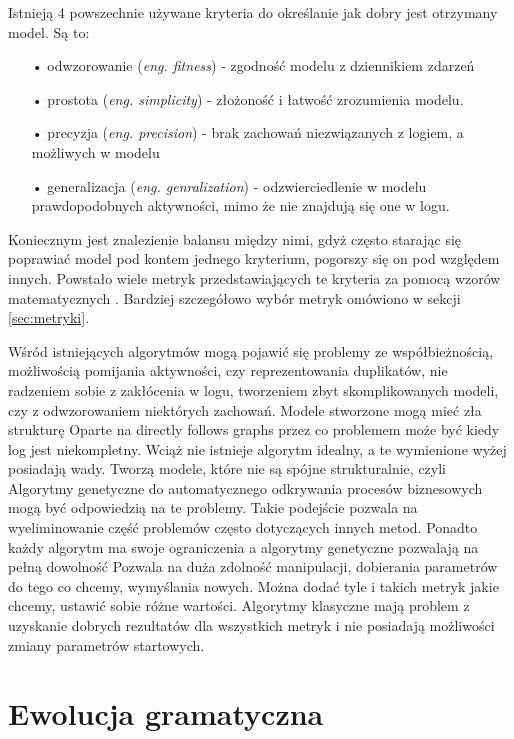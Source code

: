 Istnieją 4 powszechnie używane kryteria do określanie jak dobry jest otrzymany model. Są to:
\begin{itemize}
  \item[•] odwzorowanie (\textit{eng. fitness}) - zgodność modelu z dziennikiem zdarzeń
  \item[•] prostota (\textit{eng. simplicity}) - złożoność i łatwość zrozumienia modelu.
  \item[•] precyzja (\textit{eng. precision}) - brak zachowań niezwiązanych z logiem, a możliwych w modelu
  \item[•] generalizacja (\textit{eng. genralization}) - odzwierciedlenie w modelu prawdopodobnych aktywności, mimo że nie znajdują się one w logu.
\end{itemize}
Koniecznym jest znalezienie balansu między nimi, gdyż często starając się poprawiać model pod kontem jednego kryterium, pogorszy się on pod względem innych. Powstało wiele metryk przedstawiających te kryteria za pomocą wzorów matematycznych \cite{conf-propositions} \cite{Blum2015MetricsIP}.
Bardziej szczegółowo wybór metryk omówiono w sekcji \ref{sec:metryki}.

Wśród istniejących algorytmów mogą pojawić się problemy ze współbieżnością, możliwością pomijania aktywności, czy reprezentowania duplikatów, nie radzeniem sobie z zakłócenia w logu,  tworzeniem zbyt skomplikowanych modeli, czy z odwzorowaniem niektórych zachowań. Modele stworzone mogą mieć zła strukturę Oparte na directly follows graphs przez co problemem może być kiedy log jest niekompletny.
Wciąż nie istnieje algorytm idealny, a te wymienione wyżej posiadają wady. Tworzą modele, które nie są spójne strukturalnie, czyli 
Algorytmy genetyczne do automatycznego odkrywania procesów biznesowych mogą być odpowiedzią na te problemy. Takie podejście pozwala na wyeliminowanie część problemów często dotyczących innych metod.  Ponadto każdy algorytm ma swoje ograniczenia a algorytmy genetyczne pozwalają na pełną dowolność
Pozwala na duża zdolność manipulacji, dobierania parametrów do tego co chcemy, wymyślania nowych. Można dodać tyle i takich metryk jakie chcemy, ustawić sobie różne wartości. Algorytmy klasyczne mają problem z uzyskanie dobrych rezultatów dla wszystkich metryk i nie posiadają możliwości zmiany parametrów startowych.


\section{Ewolucja gramatyczna}
\label{sec:ewolucjaGramatyczna}
